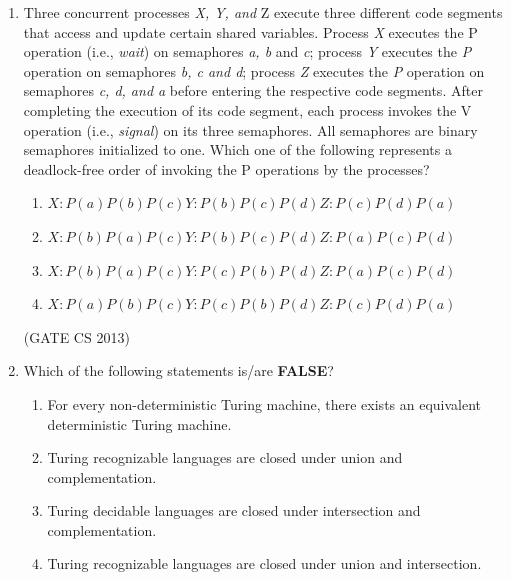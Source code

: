 \documentclass[a4paper, 11pt]{article}
\begin{document}
\begin{enumerate}
    \item Three concurrent processes \textit{X, Y, and }Z execute three different code segments that access and update certain shared variables. Process \textit{X} executes the P operation (i.e., \textit{wait}) on semaphores \textit{a, b} and \textit{c}; process \textit{Y} executes the \textit{P} operation on semaphores \textit{b, c and d}; process \textit{Z} executes the \textit{P} operation on semaphores \textit{c, d, and a} before entering the respective code segments. After completing the execution of its code segment, each process invokes the V operation (i.e., \textit{signal}) on its three semaphores. All semaphores are binary semaphores initialized to one. Which one of the following represents a deadlock-free order of invoking the P operations by the processes? 
    \begin{enumerate}
        \item $X: P(a)P(b)P(c) Y: P(b)P(c)P(d) Z: P(c)P(d)P(a) $
        \item $X: P(b)P(a)P(c) Y: P(b)P(c)P(d) Z: P(a)P(c)P(d)$
        \item $X: P(b)P(a)P(c) Y: P(c)P(b)P(d) Z: P(a)P(c)P(d)$
        \item $X: P(a)P(b)P(c) Y: P(c)P(b)P(d) Z: P(c)P(d)P(a) $
    \end{enumerate}

    \hfill (GATE CS 2013)
    
    \item Which of the following statements is/are \textbf{FALSE}? 
    \begin{enumerate}[label=\arabic*.]
        \item For every non-deterministic Turing machine, there exists an equivalent deterministic Turing machine.
        \item Turing recognizable languages are closed under union and complementation.
        \item Turing decidable languages are closed under intersection and complementation.
        \item Turing recognizable languages are closed under union and intersection. 
    \end{enumerate}
    \begin{enumerate}
    \end{enumerate}


\end{enumerate}
\end{document}
